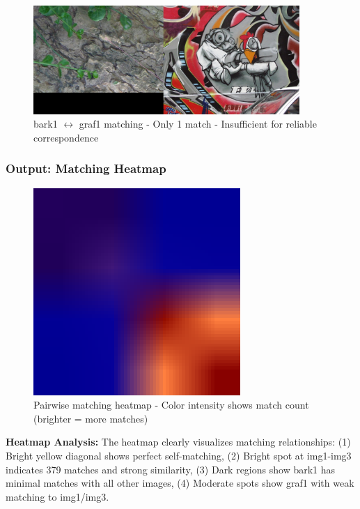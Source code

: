 \documentclass[12pt,a4paper]{article}
\begin{document}
\begin{figure}[H]
\centering
\includegraphics[width=0.9\textwidth]{report/figures/gallery_results/bark1__graf1_matches.jpg}
\caption{bark1 $\leftrightarrow$ graf1 matching - Only 1 match - Insufficient for reliable correspondence}
\end{figure}

\subsubsection{Output: Matching Heatmap}

\begin{figure}[H]
\centering
\includegraphics[width=0.7\textwidth]{report/figures/gallery_results/matches_heatmap.jpg}
\caption{Pairwise matching heatmap - Color intensity shows match count (brighter = more matches)}
\end{figure}

\textbf{Heatmap Analysis:}
The heatmap clearly visualizes matching relationships: (1) Bright yellow diagonal shows perfect self-matching, (2) Bright spot at img1-img3 indicates 379 matches and strong similarity, (3) Dark regions show bark1 has minimal matches with all other images, (4) Moderate spots show graf1 with weak matching to img1/img3.
\end{document}
